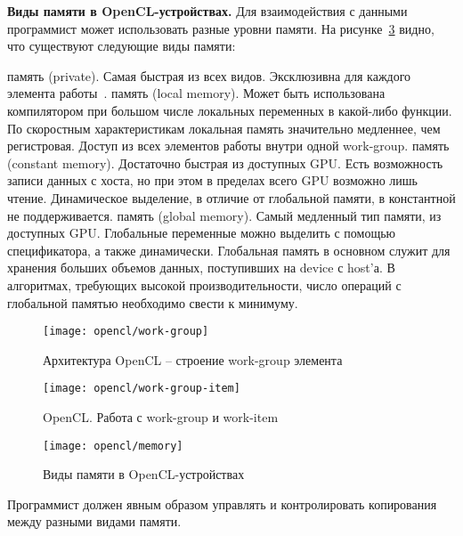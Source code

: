 \textbf{Виды памяти в OpenCL-устройствах.} Для взаимодействия с данными программист может использовать разные уровни памяти. На рисунке~\ref{OpenCLMemory:image} видно, что существуют следующие виды памяти:

\begin{itemize}
     память (private). Самая быстрая из всех видов. Эксклюзивна для каждого элемента работы~\cite{Bastrakov2011}.
     память (local memory). Может быть использована компилятором при большом числе локальных переменных в какой-либо функции. По скоростным характеристикам локальная память значительно медленнее, чем регистровая. Доступ из всех элементов работы внутри одной work-group.
     память (constant memory). Достаточно быстрая из доступных GPU. Есть возможность записи данных с хоста, но при этом в пределах всего GPU возможно лишь чтение. Динамическое выделение, в отличие от глобальной памяти, в константной не поддерживается.
     память (global memory). Самый медленный тип памяти, из доступных GPU. Глобальные переменные можно выделить с помощью спецификатора, а также динамически. Глобальная память в основном служит для хранения больших объемов данных, поступивших на device с host’а. В алгоритмах, требующих высокой производительности, число операций с глобальной памятью необходимо свести к минимуму.
\end{itemize}	

\begin{figure}[H]
    \texttt{[image: opencl/work-group]}
    \caption{Архитектура OpenCL -- строение work-group элемента}
    \label{OpenCLWorkGroup:image}
\end{figure}

\begin{figure}[H]
    \texttt{[image: opencl/work-group-item]}
    \caption{OpenCL. Работа с work-group и work-item}
    \label{OpenCLWorkGroupItemExample:image}
\end{figure}

\begin{figure}[H]
    \texttt{[image: opencl/memory]}
    \caption{Виды памяти в OpenCL-устройствах}
    \label{OpenCLMemory:image}
\end{figure}

Программист должен явным образом управлять и контролировать копирования между разными видами памяти.

